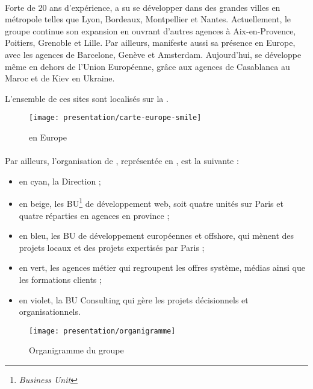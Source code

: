 \paragraph{}
Forte de 20 ans d'expérience, \asmile{} a su se développer dans des grandes villes en métropole telles que Lyon, Bordeaux, Montpellier et Nantes.
Actuellement, le groupe continue son expansion en ouvrant d'autres agences à Aix-en-Provence, Poitiers, Grenoble et Lille.
Par ailleurs, \asmile{} manifeste aussi sa présence en Europe, avec les agences de Barcelone, Genève et Amsterdam.
Aujourd'hui, \asmile{} se développe même en dehors de l'Union Européenne, grâce aux agences de Casablanca au Maroc et de Kiev en Ukraine.

L'ensemble de ces sites sont localisés sur la .

\begin{figure}
	\centering
	\texttt{[image: presentation/carte-europe-smile]}
	\caption{\asmile{} en Europe}
	\label{figure:presentation:carte}
\end{figure}


\paragraph{}
Par ailleurs, l'organisation de \asmile{}, représentée en , est la suivante :

\begin{itemize}
	\item en cyan, la Direction ;
	\item en beige, les BU\footnote{\textit{Business Unit}} de développement web, soit quatre unités sur Paris et quatre réparties en agences en province ;
	\item en bleu, les BU de développement européennes et offshore, qui mènent des projets locaux et des projets expertisés par Paris ;
	\item en vert, les agences métier qui regroupent les offres système, médias ainsi que les formations clients ;
	\item en violet, la BU Consulting qui gère les projets décisionnels et organisationnels.
\end{itemize}

\begin{figure}
	\centering
	\texttt{[image: presentation/organigramme]}
	\caption{Organigramme du groupe \asmile}
	\label{figure:presentation:organigramme}
\end{figure}



